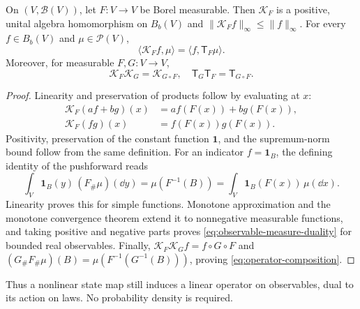 \documentclass[12pt,a4paper,oneside]{book}
\begin{document}
\begin{theorem}\label{thm:observable-measure-duality}
On $(V,\mathcal B(V))$, let $F:V\to V$ be Borel measurable. Then $\mathcal{K}_F$ is a positive, unital algebra homomorphism
on $B_b(V)$ and $\|\mathcal{K}_Ff\|_\infty\leq\|f\|_\infty$. For every $f\in B_b(V)$ and $\mu\in\mathcal P(V)$,
\begin{equation}
    \boxed{\langle \mathcal{K}_Ff,\mu\rangle=\langle f,\mathsf T_F\mu\rangle.}
    \label{eq:observable-measure-duality}
\end{equation}
Moreover, for measurable $F,G:V\to V$,
\begin{equation}
    \mathcal{K}_F\mathcal{K}_G=\mathcal{K}_{G\circ F},\quad \mathsf T_G\mathsf T_F=\mathsf T_{G\circ F}.
    \label{eq:operator-composition}
\end{equation}
\end{theorem}

\begin{proof}
Linearity and preservation of products follow by evaluating at $x$:
\begin{equation*}
\begin{aligned}
        \mathcal{K}_F(af+bg)(x)&=af(F(x))+bg(F(x)),\\
        \mathcal{K}_F(fg)(x)&=f(F(x))g(F(x)).
    \end{aligned}
\end{equation*}
Positivity, preservation of the constant function $\mathbf1$, and the supremum-norm bound follow from the same definition.
For an indicator $f=\mathbf1_B$, the defining identity of the pushforward reads
\begin{equation*}
\int_V\mathbf1_B(y)\,(F_\#\mu)(\dd y)
    =\mu(F^{-1}(B))
    =\int_V\mathbf1_B(F(x))\,\mu(\dd x).
\end{equation*}
Linearity proves this for simple functions. Monotone approximation and the monotone convergence theorem extend it to nonnegative
measurable functions, and taking positive and negative parts proves \eqref{eq:observable-measure-duality} for bounded real
observables. Finally, $\mathcal{K}_F\mathcal{K}_Gf=f\circ G\circ F$ and $(G_\#F_\#\mu)(B)=\mu(F^{-1}(G^{-1}(B)))$, proving
\eqref{eq:operator-composition}.
\end{proof}

Thus a nonlinear state map still induces a linear operator on observables, dual to its action on laws. No probability density
is required.
\end{document}
